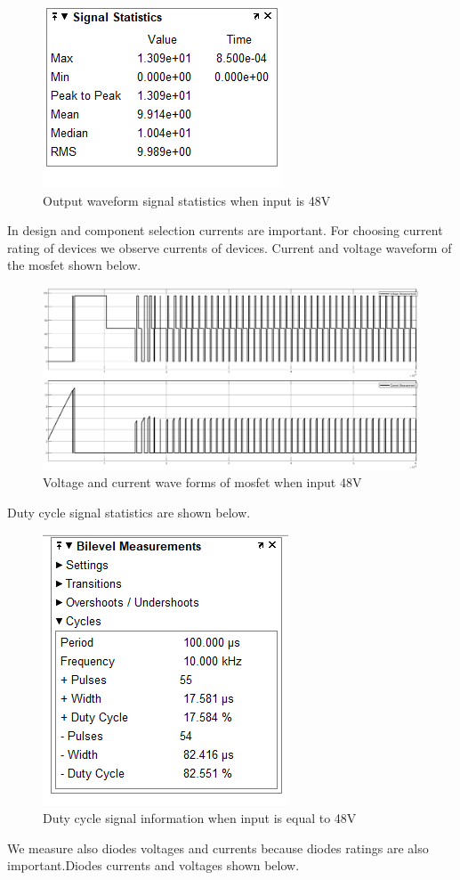 \documentclass{article}
\newcommand\tab[1][1cm]{\hspace*{#1}}
\begin{document}
\begin{figure}[H]
    \centering
    \includegraphics[scale=0.9]{48sinyal.PNG}
    \caption{Output waveform signal statistics when input is 48V}
    \label{fig:my_label}
\end{figure}

\tab In design and component selection currents are important. For choosing current rating of devices we observe currents of devices. Current and voltage waveform of the mosfet shown below. 

\begin{figure}[H]
    \centering
    \includegraphics[scale=0.35]{mosfet.png}
    \caption{Voltage and current wave forms of mosfet when input 48V}
    \label{fig:my_label}
\end{figure}
\tap Duty cycle signal statistics are shown below. 
\begin{figure}[H]
    \centering
    \includegraphics[scale=0.8]{duty48.PNG}
    \caption{Duty cycle signal information when input is equal to 48V}
    \label{fig:my_label}
\end{figure}
\tab We measure also diodes voltages and currents because diodes ratings are also important.Diodes currents and voltages shown below.
\end{document}
